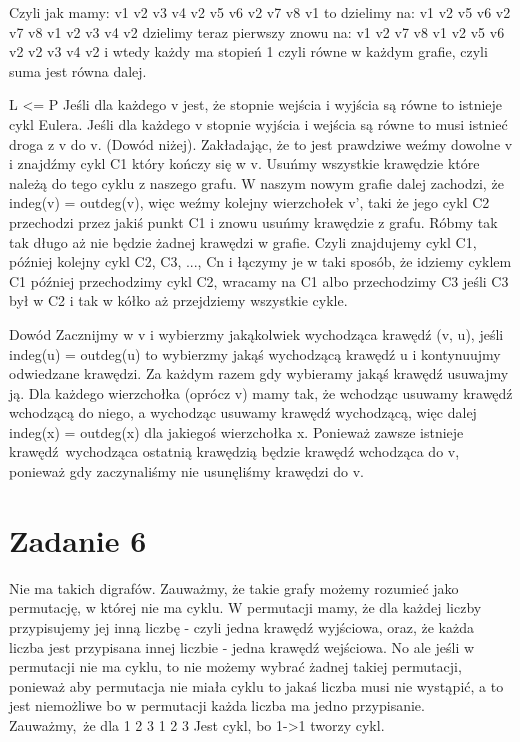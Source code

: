 \documentclass[12pt]{article}
\begin{document}
Czyli jak mamy:
v1 v2 v3 v4 v2 v5 v6 v2 v7 v8 v1 
to dzielimy na:
v1 v2 v5 v6 v2 v7 v8 v1 
v2 v3 v4 v2 
dzielimy teraz pierwszy znowu na: 
v1 v2 v7 v8 v1 
v2 v5 v6 v2
v2 v3 v4 v2 
i wtedy każdy ma stopień 1 czyli równe w każdym grafie, czyli suma jest równa dalej.

L <= P
Jeśli dla każdego v jest, że stopnie wejścia i wyjścia są równe to istnieje cykl Eulera.
Jeśli dla każdego v stopnie wyjścia i wejścia są równe to musi istnieć droga z v do v. (Dowód niżej). Zakładając, że to jest prawdziwe weźmy dowolne v i znajdźmy cykl C1 który kończy się w v. Usuńmy wszystkie krawędzie które należą do tego cyklu z naszego grafu. W naszym nowym grafie dalej zachodzi, że indeg(v) = outdeg(v), więc weźmy kolejny wierzchołek v', taki że jego cykl C2 przechodzi przez jakiś punkt C1 i znowu usuńmy krawędzie z grafu. Róbmy tak tak długo aż nie będzie żadnej krawędzi w grafie.
Czyli znajdujemy cykl C1, później kolejny cykl C2, C3, ..., Cn i łączymy je w taki sposób, że idziemy cyklem C1 później przechodzimy cykl C2, wracamy na C1 albo przechodzimy C3 jeśli C3 był w C2 i tak w kółko aż przejdziemy wszystkie cykle.

Dowód 
Zacznijmy w v i wybierzmy jakąkolwiek wychodząca krawędź (v, u), jeśli indeg(u) = outdeg(u) to wybierzmy jakąś wychodzącą krawędź u i kontynuujmy odwiedzane krawędzi. Za każdym razem gdy wybieramy jakąś krawędź usuwajmy ją. Dla każdego wierzchołka (oprócz v) mamy tak, że wchodząc usuwamy krawędź wchodzącą do niego, a wychodząc usuwamy krawędź wychodzącą, więc dalej indeg(x) = outdeg(x) dla jakiegoś wierzchołka x. Ponieważ zawsze istnieje krawędź wychodząca ostatnią krawędzią będzie krawędź wchodząca do v, ponieważ gdy zaczynaliśmy nie usunęliśmy krawędzi do v.

\section{Zadanie 6} %
Nie ma takich digrafów.
Zauważmy, że takie grafy możemy rozumieć jako permutację, w której nie ma cyklu. W permutacji mamy, że dla każdej liczby przypisujemy jej inną liczbę - czyli jedna krawędź wyjściowa, oraz, że każda liczba jest przypisana innej liczbie - jedna krawędź wejściowa. 
No ale jeśli w permutacji nie ma cyklu, to nie możemy wybrać żadnej takiej permutacji, ponieważ aby permutacja nie miała cyklu to jakaś liczba musi nie wystąpić, a to jest niemożliwe bo w permutacji każda liczba ma jedno przypisanie.
Zauważmy, że dla 
1 2 3
1 2 3
Jest cykl, bo 1->1 tworzy cykl.
\end{document}
